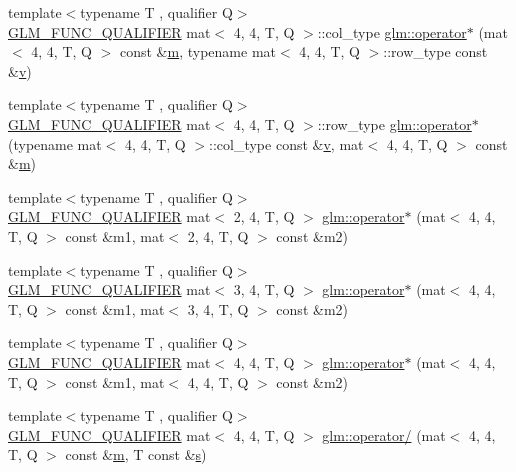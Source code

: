 \begin{DoxyCompactItemize}
\item 
{\footnotesize template$<$typename T , qualifier Q$>$ }\\\hyperlink{setup_8hpp_a33fdea6f91c5f834105f7415e2a64407}{G\+L\+M\+\_\+\+F\+U\+N\+C\+\_\+\+Q\+U\+A\+L\+I\+F\+I\+ER} mat$<$ 4, 4, T, Q $>$\+::col\+\_\+type \hyperlink{namespaceglm_a06757e039fd5931572ab128492a78b49}{glm\+::operator$\ast$} (mat$<$ 4, 4, T, Q $>$ const \&\hyperlink{_s_d_l__opengl__glext_8h_af593500c283bf1a787a6f947f503a5c2}{m}, typename mat$<$ 4, 4, T, Q $>$\+::row\+\_\+type const \&\hyperlink{_s_d_l__opengl_8h_a10a82eabcb59d2fcd74acee063775f90}{v})
\item 
{\footnotesize template$<$typename T , qualifier Q$>$ }\\\hyperlink{setup_8hpp_a33fdea6f91c5f834105f7415e2a64407}{G\+L\+M\+\_\+\+F\+U\+N\+C\+\_\+\+Q\+U\+A\+L\+I\+F\+I\+ER} mat$<$ 4, 4, T, Q $>$\+::row\+\_\+type \hyperlink{namespaceglm_ad1596a8d5b5d11322c0f70288f5b4dce}{glm\+::operator$\ast$} (typename mat$<$ 4, 4, T, Q $>$\+::col\+\_\+type const \&\hyperlink{_s_d_l__opengl_8h_a10a82eabcb59d2fcd74acee063775f90}{v}, mat$<$ 4, 4, T, Q $>$ const \&\hyperlink{_s_d_l__opengl__glext_8h_af593500c283bf1a787a6f947f503a5c2}{m})
\item 
{\footnotesize template$<$typename T , qualifier Q$>$ }\\\hyperlink{setup_8hpp_a33fdea6f91c5f834105f7415e2a64407}{G\+L\+M\+\_\+\+F\+U\+N\+C\+\_\+\+Q\+U\+A\+L\+I\+F\+I\+ER} mat$<$ 2, 4, T, Q $>$ \hyperlink{namespaceglm_a7b1b919046008866e15bf2ec344cdc90}{glm\+::operator$\ast$} (mat$<$ 4, 4, T, Q $>$ const \&m1, mat$<$ 2, 4, T, Q $>$ const \&m2)
\item 
{\footnotesize template$<$typename T , qualifier Q$>$ }\\\hyperlink{setup_8hpp_a33fdea6f91c5f834105f7415e2a64407}{G\+L\+M\+\_\+\+F\+U\+N\+C\+\_\+\+Q\+U\+A\+L\+I\+F\+I\+ER} mat$<$ 3, 4, T, Q $>$ \hyperlink{namespaceglm_a840e2309b365871aecc173381ca3b770}{glm\+::operator$\ast$} (mat$<$ 4, 4, T, Q $>$ const \&m1, mat$<$ 3, 4, T, Q $>$ const \&m2)
\item 
{\footnotesize template$<$typename T , qualifier Q$>$ }\\\hyperlink{setup_8hpp_a33fdea6f91c5f834105f7415e2a64407}{G\+L\+M\+\_\+\+F\+U\+N\+C\+\_\+\+Q\+U\+A\+L\+I\+F\+I\+ER} mat$<$ 4, 4, T, Q $>$ \hyperlink{namespaceglm_ad8f4287ee1fb03675fd3d6040078586d}{glm\+::operator$\ast$} (mat$<$ 4, 4, T, Q $>$ const \&m1, mat$<$ 4, 4, T, Q $>$ const \&m2)
\item 
{\footnotesize template$<$typename T , qualifier Q$>$ }\\\hyperlink{setup_8hpp_a33fdea6f91c5f834105f7415e2a64407}{G\+L\+M\+\_\+\+F\+U\+N\+C\+\_\+\+Q\+U\+A\+L\+I\+F\+I\+ER} mat$<$ 4, 4, T, Q $>$ \hyperlink{namespaceglm_af9a49fff03e1135c8a4e7736ef113e9e}{glm\+::operator/} (mat$<$ 4, 4, T, Q $>$ const \&\hyperlink{_s_d_l__opengl__glext_8h_af593500c283bf1a787a6f947f503a5c2}{m}, T const \&\hyperlink{_s_d_l__opengl_8h_a4af680a6c683f88ed67b76f207f2e6e4}{s})

\end{DoxyCompactItemize}
